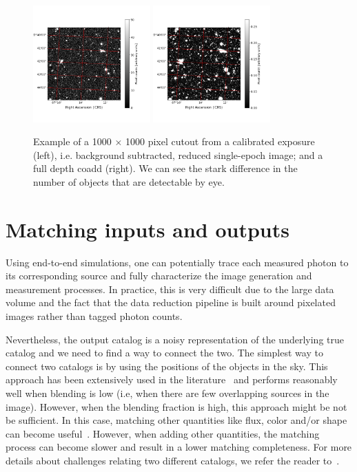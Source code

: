 \documentclass[\docopts]{\docclass}
\begin{document}
\begin{figure}
\centering
\includegraphics[width=0.4\textwidth]{calexp_example.png}
\includegraphics[width=0.4\textwidth]{coadd_example.png}
\caption{Example of a 1000 $\times$ 1000 pixel cutout from a calibrated exposure (left), i.e. background subtracted, reduced single-epoch image; and a full depth coadd (right). We can see the stark difference in the number of objects that are detectable by eye.}
\label{fig:coadd_example}
\end{figure}

\section{Matching inputs and outputs}
\label{sec:matching}

Using end-to-end simulations, one can potentially trace each measured photon to its corresponding source and fully characterize the image generation and measurement processes. In practice, this is very difficult due to the large data volume and the fact that the data reduction pipeline is built around pixelated images rather than tagged photon counts.

Nevertheless, the output catalog is a noisy representation of the underlying true catalog and we need to find a way to connect the two. 
The simplest way to connect two catalogs is by using the positions of the objects in the sky. This approach has been extensively used in the literature~\citep{1977A&AS...28..211D,1983Obs...103..150B,1986MNRAS.223..279W} and performs reasonably well when blending is low (i.e, when there are few overlapping sources in the image). However, when the blending fraction is high, this approach might be not be sufficient. In this case, matching other quantities like flux, color and/or shape can become useful~\citep{2008ApJ...679..301B, doi:10.1146/annurev-statistics-010814-020231}. However, when adding other quantities, the matching process can become slower and result in a lower matching completeness. For more details about challenges relating two different catalogs, we refer the reader to~\citet{doi:10.1146/annurev-statistics-010814-020231}. 
\end{document}
